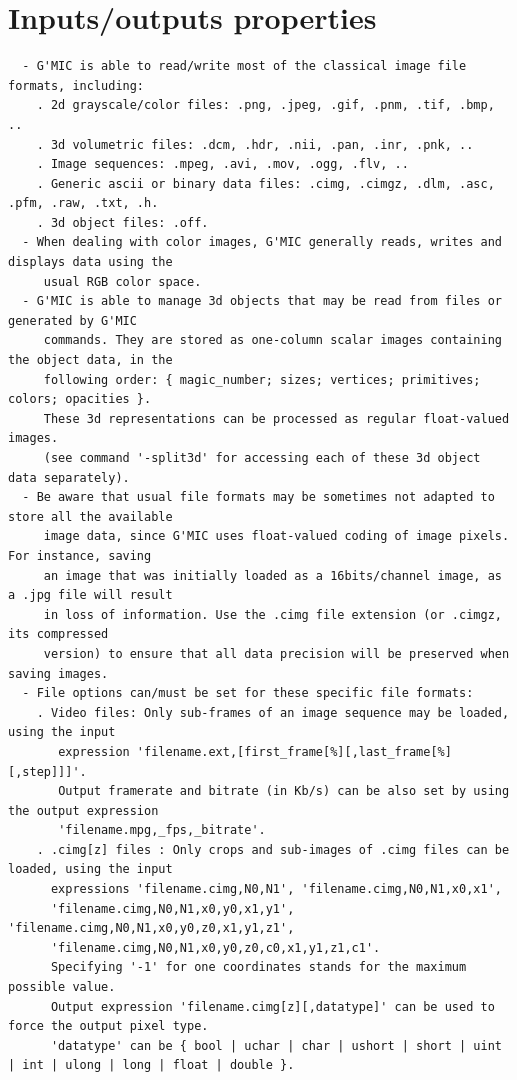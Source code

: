 \documentclass[a4paper,11pt,twoside]{book}
\begin{document}
\section{Inputs/outputs properties}
\small
\begin{lstlisting}
  - G'MIC is able to read/write most of the classical image file formats, including: 
    . 2d grayscale/color files: .png, .jpeg, .gif, .pnm, .tif, .bmp, .. 
    . 3d volumetric files: .dcm, .hdr, .nii, .pan, .inr, .pnk, .. 
    . Image sequences: .mpeg, .avi, .mov, .ogg, .flv, .. 
    . Generic ascii or binary data files: .cimg, .cimgz, .dlm, .asc, .pfm, .raw, .txt, .h. 
    . 3d object files: .off. 
  - When dealing with color images, G'MIC generally reads, writes and displays data using the 
     usual RGB color space. 
  - G'MIC is able to manage 3d objects that may be read from files or generated by G'MIC 
     commands. They are stored as one-column scalar images containing the object data, in the 
     following order: { magic_number; sizes; vertices; primitives; colors; opacities }. 
     These 3d representations can be processed as regular float-valued images. 
     (see command '-split3d' for accessing each of these 3d object data separately). 
  - Be aware that usual file formats may be sometimes not adapted to store all the available 
     image data, since G'MIC uses float-valued coding of image pixels. For instance, saving 
     an image that was initially loaded as a 16bits/channel image, as a .jpg file will result 
     in loss of information. Use the .cimg file extension (or .cimgz, its compressed 
     version) to ensure that all data precision will be preserved when saving images. 
  - File options can/must be set for these specific file formats: 
    . Video files: Only sub-frames of an image sequence may be loaded, using the input 
       expression 'filename.ext,[first_frame[%][,last_frame[%][,step]]]'. 
       Output framerate and bitrate (in Kb/s) can be also set by using the output expression 
       'filename.mpg,_fps,_bitrate'. 
    . .cimg[z] files : Only crops and sub-images of .cimg files can be loaded, using the input 
      expressions 'filename.cimg,N0,N1', 'filename.cimg,N0,N1,x0,x1', 
      'filename.cimg,N0,N1,x0,y0,x1,y1', 'filename.cimg,N0,N1,x0,y0,z0,x1,y1,z1', 
      'filename.cimg,N0,N1,x0,y0,z0,c0,x1,y1,z1,c1'. 
      Specifying '-1' for one coordinates stands for the maximum possible value. 
      Output expression 'filename.cimg[z][,datatype]' can be used to force the output pixel type. 
      'datatype' can be { bool | uchar | char | ushort | short | uint | int | ulong | long | float | double }. 

\end{lstlisting}
\end{document}
